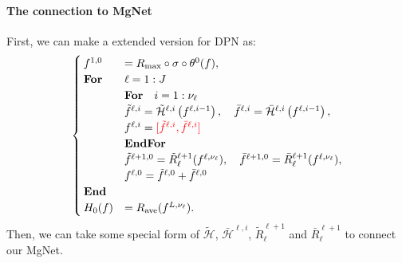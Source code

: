 \paragraph{The connection to MgNet}
First, we can make a extended version for DPN as:
\begin{equation}\label{eq:DPN}
\begin{cases}
f^{1,0} &=R_{\rm max}\circ \sigma \circ \theta^0(f), \\
\text{\bf For} &\ell = 1:J \\
\quad &\text{\bf For} \quad i = 1:\nu_\ell \\
&\tilde{f}^{\ell,i} = \tilde{\mathcal{H}}^{\ell,i} \left(  f^{\ell,i-1} \right), 
\quad  \bar{f}^{\ell,i} = \bar{\mathcal{H}}^{\ell,i} \left( f^{\ell,i-1} \right),\\ 
&f^{\ell,i} =  \textcolor{red}{[\tilde f^{\ell,i} ,\bar f^{\ell,i}]}\\
\quad &\text{\bf EndFor} \\
&\tilde f^{\ell+1,0} =  \tilde R_\ell^{\ell+1} ( f^{\ell, \nu_\ell} ) ,  \quad \bar f^{\ell+1,0} =  \bar R_\ell^{\ell+1} ( f^{\ell, \nu_\ell} ) ,\\
&f^{\ell,0} =  \tilde f^{\ell,0} +  \bar f^{\ell,0} \\
\text{\bf End} &\\
H_0(f) &=  R_{\rm ave}(f^{L,\nu_\ell}). \\
\end{cases}
\end{equation}
Then, we can take some special form of $ \tilde{\mathcal{H}}$,
$\bar{\mathcal{H}}^{\ell,i}$, $\tilde R_\ell^{\ell+1}$ and $ \bar R_\ell^{\ell+1}$
to connect our MgNet. 
